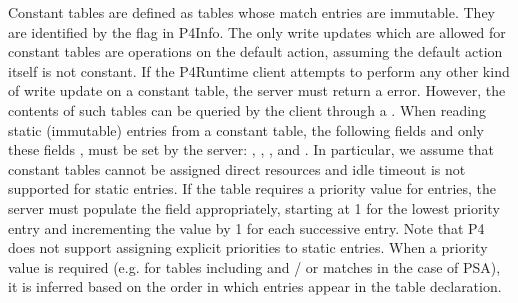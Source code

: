 \documentclass[11pt]{article}
\begin{document}
{%
\noindent{}Constant tables are defined as tables whose match entries are immutable. They
are identified by the  flag in P4Info. The only write updates
which are allowed for constant tables are  operations on the default
action, assuming the default action itself is not constant. If the P4Runtime
client attempts to perform any other kind of write update on a constant table,
the server must return a  error. However, the contents of
such tables can be queried by the client through a . When reading
static (immutable) entries from a constant table, the following fields \textemdash{} and
only these fields \textemdash{}, must be set by the server: , , ,
 and . In particular, we assume that constant
tables cannot be assigned direct resources and idle timeout is not supported for
static entries. If the table requires a priority value for entries, the server
must populate the  field appropriately, starting at 1 for the lowest
priority entry and incrementing the value by 1 for each successive entry. Note
that P4 does not support assigning explicit priorities to static
entries. When a priority value is required (e.g. for tables including 
and / or  matches in the case of PSA), it is inferred based on the
order in which entries appear in the table declaration.%

}
\end{document}

